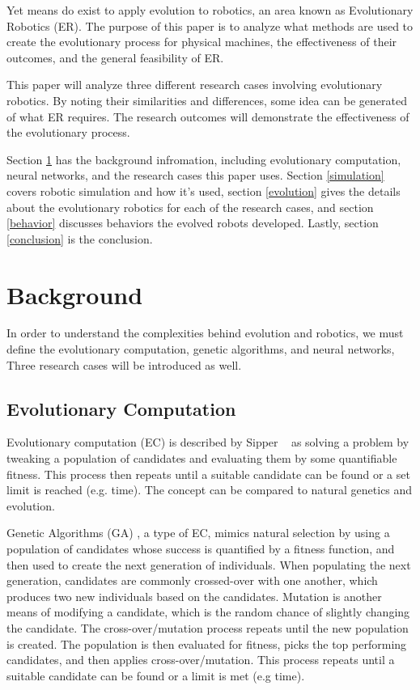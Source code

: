 \documentclass{sig-alternate}
\begin{document}
 Yet means do exist to apply evolution to robotics, an area known as Evolutionary Robotics (ER). The purpose of this paper is to analyze what methods are used to create the evolutionary process for physical machines, the effectiveness of their outcomes, and the general feasibility of ER.
 
 This paper will analyze three different research cases involving evolutionary robotics. By noting their similarities and differences, some idea can be generated of what ER requires. The research outcomes will demonstrate the effectiveness of the evolutionary process.

   Section \ref{background}  has the background infromation, including evolutionary computation, neural networks, and the research cases this paper uses. Section \ref{simulation} covers robotic simulation and how it's used, section \ref{evolution} gives the details about the evolutionary robotics for each of the research cases, and section \ref{behavior} discusses behaviors the evolved robots developed. Lastly, section \ref{conclusion} is the conclusion.
 
 
\section{Background}\label{background}
In order to understand the complexities behind evolution and robotics, we must define the evolutionary computation, genetic algorithms, and neural networks, Three research cases will be introduced as well.

 \subsection{Evolutionary Computation}\label{background EC}
  Evolutionary computation (EC) is described by Sipper ~\cite{Sipper2011Win} as solving a problem by tweaking a population of candidates and evaluating them by some quantifiable fitness. This process then repeats until a suitable candidate can be found or a set limit is reached (e.g. time). The concept can be compared to natural genetics and evolution.
  
  Genetic Algorithms (GA) \cite{wiki:GeneticAlgorithms}, a type of EC, mimics natural selection by using a population of candidates whose success is quantified by a fitness function, and then used to create the next generation of individuals. When populating the next generation, candidates are commonly crossed-over with one another, which produces two new individuals based on the candidates. Mutation is another means of modifying a candidate, which is the random chance  of slightly changing the candidate. The cross-over/mutation process repeats until the new population is created. The population is then evaluated for fitness, picks the top performing candidates, and then applies cross-over/mutation. This process  repeats until a suitable candidate can be found or a limit is met (e.g time).
  
\end{document}
